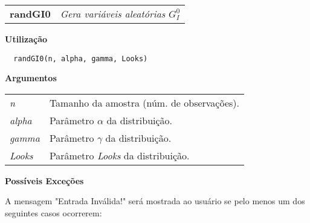 \newpage


\hrulefill   

\begin{table}[!ht]
\begin{center}
\begin{tabularx}{\textwidth}{ X X}
\hspace{0.5cm} \textbf{randGI0} & \textit{Gera variáveis aleatórias $G_I^0$}\\
\end{tabularx}
\end{center}
\end{table} 

\vspace{-0.5cm}
\hrulefill  
\vspace{0.5cm}

\textbf{Utilização}

\begin{lstlisting}
  randGI0(n, alpha, gamma, Looks)
\end{lstlisting}

\vspace{0.5cm}

\textbf{Argumentos}

\begin{table}[!ht]
\begin{center}
\begin{tabularx}{\textwidth}{X X}
\hspace{0.5cm} \textit{n} & Tamanho da amostra (núm. de observações).\\
\hspace{0.5cm} \textit{alpha} & Parâmetro $\alpha$ da distribuição.\\
\hspace{0.5cm} \textit{gamma} & Parâmetro $\gamma$ da distribuição.\\
\hspace{0.5cm} \textit{Looks} & Parâmetro \textit{Looks} da distribuição.\\
\end{tabularx}
\end{center}
\end{table} 

\textbf{Possíveis Exceções}

\vspace{0.5cm}

A mensagem "Entrada Inválida!" será mostrada ao usuário se pelo menos um dos seguintes casos ocorrerem:

